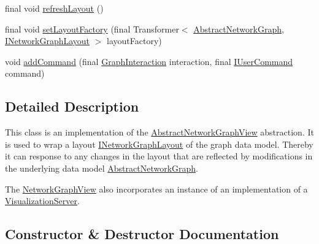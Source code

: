 \begin{DoxyCompactItemize}
\item 
final void \hyperlink{classedu_1_1kit_1_1trufflehog_1_1view_1_1_network_graph_view_af48de43ec2925b944461211e20706ccb}{refresh\+Layout} ()
\item 
final void \hyperlink{classedu_1_1kit_1_1trufflehog_1_1view_1_1_network_graph_view_af0f18011f6bfa1902659b4a15be45010}{set\+Layout\+Factory} (final Transformer$<$ \hyperlink{classedu_1_1kit_1_1trufflehog_1_1model_1_1graph_1_1_abstract_network_graph}{Abstract\+Network\+Graph}, \hyperlink{interfaceedu_1_1kit_1_1trufflehog_1_1model_1_1graph_1_1_i_network_graph_layout}{I\+Network\+Graph\+Layout} $>$ layout\+Factory)
\item 
void \hyperlink{classedu_1_1kit_1_1trufflehog_1_1view_1_1_network_graph_view_ae00af01a1adc46ce8bf68816ecb12c4e}{add\+Command} (final \hyperlink{enumedu_1_1kit_1_1trufflehog_1_1interaction_1_1_graph_interaction}{Graph\+Interaction} interaction, final \hyperlink{interfaceedu_1_1kit_1_1trufflehog_1_1command_1_1usercommand_1_1_i_user_command}{I\+User\+Command} command)
\end{DoxyCompactItemize}


\subsection{Detailed Description}
This class is an implementation of the \hyperlink{classedu_1_1kit_1_1trufflehog_1_1view_1_1_abstract_network_graph_view}{Abstract\+Network\+Graph\+View} abstraction. It is used to wrap a layout \hyperlink{}{I\+Network\+Graph\+Layout} of the graph data model. Thereby it can response to any changes in the layout that are reflected by modifications in the underlying data model \hyperlink{}{Abstract\+Network\+Graph}. 

The \hyperlink{classedu_1_1kit_1_1trufflehog_1_1view_1_1_network_graph_view}{Network\+Graph\+View} also incorporates an instance of an implementation of a \hyperlink{}{Visualization\+Server}. 

\subsection{Constructor \& Destructor Documentation}
\hypertarget{classedu_1_1kit_1_1trufflehog_1_1view_1_1_network_graph_view_a24ededf86fdd8a0d9d92be75340c698b}{}
